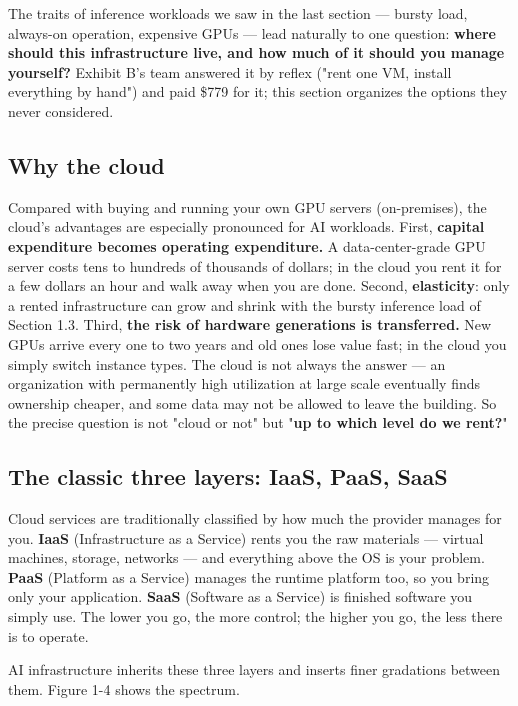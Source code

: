 The traits of inference workloads we saw in the last section — bursty load, always-on operation, expensive GPUs — lead naturally to one question: \textbf{where should this infrastructure live, and how much of it should you manage yourself?} Exhibit B's team answered it by reflex ("rent one VM, install everything by hand") and paid \$779 for it; this section organizes the options they never considered.

\subsection*{Why the cloud}

Compared with buying and running your own GPU servers (on-premises), the cloud's advantages are especially pronounced for AI workloads. First, \textbf{capital expenditure becomes operating expenditure.} A data-center-grade GPU server costs tens to hundreds of thousands of dollars; in the cloud you rent it for a few dollars an hour and walk away when you are done. Second, \textbf{elasticity}: only a rented infrastructure can grow and shrink with the bursty inference load of Section 1.3. Third, \textbf{the risk of hardware generations is transferred.} New GPUs arrive every one to two years and old ones lose value fast; in the cloud you simply switch instance types. The cloud is not always the answer — an organization with permanently high utilization at large scale eventually finds ownership cheaper, and some data may not be allowed to leave the building. So the precise question is not "cloud or not" but "\textbf{up to which level do we rent?}"

\subsection*{The classic three layers: IaaS, PaaS, SaaS}

Cloud services are traditionally classified by how much the provider manages for you. \textbf{IaaS} (Infrastructure as a Service) rents you the raw materials — virtual machines, storage, networks — and everything above the OS is your problem. \textbf{PaaS} (Platform as a Service) manages the runtime platform too, so you bring only your application. \textbf{SaaS} (Software as a Service) is finished software you simply use. The lower you go, the more control; the higher you go, the less there is to operate.

AI infrastructure inherits these three layers and inserts finer gradations between them. Figure 1-4 shows the spectrum.

